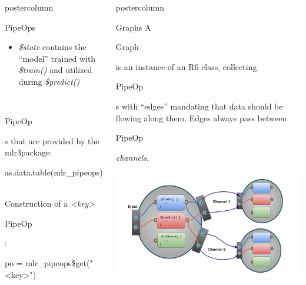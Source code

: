 \documentclass{beamer}
\newlength{\columnheight} %
\newcommand{\codeinline}[1]{\begin{codeboxinline}#1\end{codeboxinline}}
\begin{document}
\begin{frame}[fragile]{}
\begin{columns}
\begin{column}{.245\textwidth}
\begin{beamercolorbox}[center]{postercolumn}
\begin{minipage}{.98\textwidth}
{\begin{myblock}{PipeOps}
\begin{itemize}
                \item \textit{\$state} contains the ``model'' trained with \textit{\$train()} and utilized during \textit{\$predict()}
              \end{itemize}
              \ \\
              \codeinline{PipeOp}s that are provided by the mlr3package:
              \begin{codebox}
                as.data.table(mlr\_pipeops)
              \end{codebox}
              \ \\
              Construction of a \textit{<key>} \codeinline{PipeOp}:
              \begin{codebox}
                po = mlr\_pipeops\$get("<key>")
              \end{codebox}
						\end{myblock}
						\vfill}
				\end{minipage}
			\end{beamercolorbox}
		\end{column}
		\begin{column}{.245\textwidth}
			\begin{beamercolorbox}[center]{postercolumn}
				\begin{minipage}{.98\textwidth}
					\parbox[t][\columnheight]{\textwidth}{
						\begin{myblock}{Graphs}
              A \codeinline{Graph} is an instance of an R6 class, collecting \codeinline{PipeOp}s with ``edges'' mandating that data should be flowing along them. Edges always pass between \codeinline{PipeOp} \textit{channels}.
              \\
              \\
              \includegraphics[width=\textwidth]{img/po_multi_viz.png}

\end{myblock}}
\end{minipage}
\end{beamercolorbox}
\end{column}
\end{columns}
\end{frame}
\end{document}
